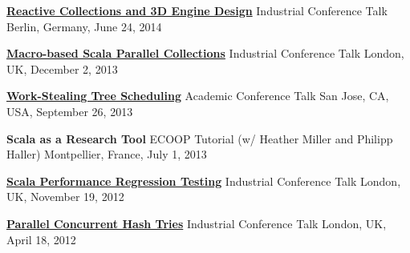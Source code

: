 \documentclass[9pt]{article}
\begin{document}
\noindent\href{https://www.parleys.com/tutorial/53a7d2cde4b0543940d9e561/chapter1/about}
{\bf Reactive Collections and 3D Engine Design}
\vspace{-0.03in}
\newline\noindent Industrial Conference Talk
\dates{}
\linebreak\noindent Berlin, Germany, June 24, 2014
\bigskip

\noindent
\href{http://skillsmatter.com/podcast/scala/macro-based-scala-parallel-collections}
{\bf Macro-based Scala Parallel Collections}
\vspace{-0.03in}
\newline\noindent Industrial Conference Talk
\dates{}
\linebreak\noindent London, UK, December 2, 2013
\bigskip

\noindent\href{http://axel22.github.io/resources/docs/lcpc13.pptx}
{\bf Work-Stealing Tree Scheduling}
\vspace{-0.03in}
\newline\noindent Academic Conference Talk
\dates{}
\linebreak\noindent San Jose, CA, USA, September 26, 2013
\bigskip

\noindent
{\bf Scala as a Research Tool}
\vspace{-0.03in}
\newline\noindent ECOOP Tutorial
                  (w/ Heather Miller and Philipp Haller)
\dates{}
\linebreak\noindent Montpellier, France, July 1, 2013
\bigskip

\noindent
\href{https://skillsmatter.com/skillscasts/3701-scala-performance-regression-testing}
{\bf Scala Performance Regression Testing}
\vspace{-0.03in}
\newline\noindent Industrial Conference Talk
\dates{}
\linebreak\noindent London, UK, November 19, 2012
\bigskip

\noindent\href{https://skillsmatter.com/skillscasts/3234-parallel-concurrent-hash-tries}
{\bf Parallel Concurrent Hash Tries}
\vspace{-0.03in}
\newline\noindent Industrial Conference Talk
\dates{}
\linebreak\noindent London, UK, April 18, 2012
\bigskip
\end{document}
